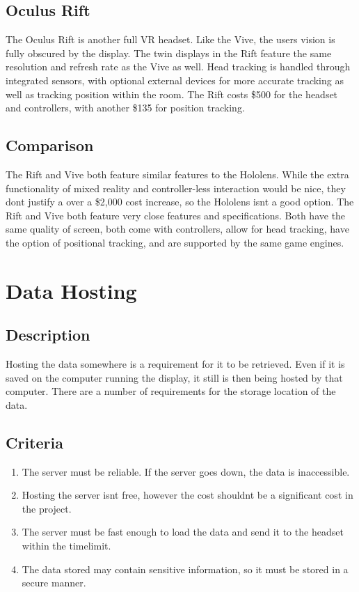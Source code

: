 \documentclass[letterpaper,10pt,onecolumn]{IEEEtran}
\begin{document}
  \subsection {Oculus Rift}
    The Oculus Rift is another full VR headset. Like the Vive, the user\textsc\textquotesingle s vision is fully obscured by the display. The twin displays in the Rift feature the same resolution and refresh rate as the Vive as well. Head tracking is handled through integrated sensors, with optional external devices for more accurate tracking as well as tracking position within the room. The Rift costs \$500 for the headset and controllers, with another \$135 for position tracking. \cite{rift}
  \subsection {Comparison}
    The Rift and Vive both feature similar features to the Hololens. While the extra functionality of mixed reality and controller-less interaction would be nice, they don\textsc\textquotesingle t justify a over a \$2,000 cost increase, so the Hololens isn\textsc\textquotesingle t a good option. The Rift and Vive both feature very close features and specifications. Both have the same quality of screen, both come with controllers, allow for head tracking, have the option of positional tracking, and are supported by the same game engines.

\section{Data Hosting}
  \subsection {Description}
    Hosting the data somewhere is a requirement for it to be retrieved. Even if it is saved on the computer running the display, it still is then being hosted by that computer. There are a number of requirements for the storage location of the data.
  \subsection {Criteria}
    \begin{enumerate}
      \item The server must be reliable. If the server goes down, the data is inaccessible.
      \item Hosting the server isn\textsc\textquotesingle t free, however the cost shouldn\textsc\textquotesingle t be a significant cost in the project.
      \item The server must be fast enough to load the data and send it to the headset within the timelimit.
      \item The data stored may contain sensitive information, so it must be stored in a secure manner.
    \end{enumerate}
\end{document}
